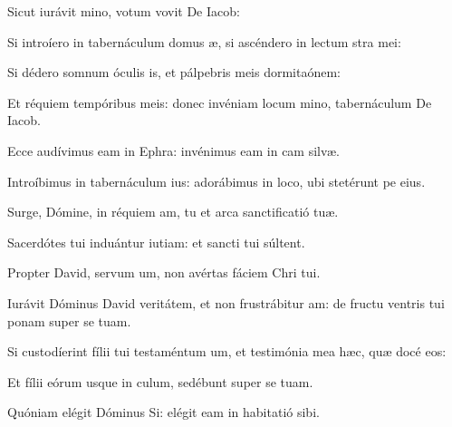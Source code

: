 \item {}

\item Sicut iurávit mino,\psstar{} votum vovit De Iacob:

\item Si introíero in tabernáculum domus æ,\psstar{} si ascéndero in lectum stra mei:

\item Si dédero somnum óculis is,\psstar{} et pálpebris meis dormitaónem:

\item Et réquiem tempóribus meis: donec invéniam locum mino,\psstar{} tabernáculum De Iacob.

\item Ecce audívimus eam in Ephra:\psstar{} invénimus eam in cam silvæ.

\item Introíbimus in tabernáculum ius:\psstar{} adorábimus in loco, ubi stetérunt pe eius.

\item Surge, Dómine, in réquiem am,\psstar{} tu et arca sanctificatió tuæ.

\item Sacerdótes tui induántur iutiam:\psstar{} et sancti tui súltent.

\item Propter David, servum um,\psstar{} non avértas fáciem Chri tui.

\item Iurávit Dóminus David veritátem, et non frustrábitur am:\psstar{} de fructu ventris tui ponam super se tuam.

\item Si custodíerint fílii tui testaméntum um,\psstar{} et testimónia mea hæc, quæ docé eos:

\item Et fílii eórum usque in culum,\psstar{} sedébunt super se tuam.

\item Quóniam elégit Dóminus Si:\psstar{} elégit eam in habitatió sibi.


